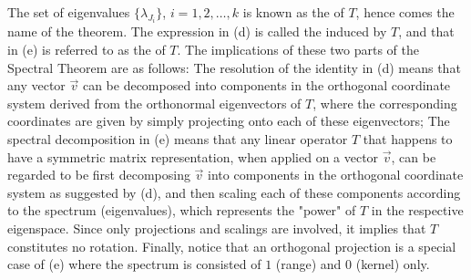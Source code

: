 The set of eigenvalues $\{\lambda_{J_i}\}$, $i = 1,2,\ldots,k$ is known as the  of $T$, hence comes the name of the theorem. The expression in (d) is called the  induced by $T$, and that in (e) is referred to as the  of $T$. The implications of these two parts of the Spectral Theorem are as follows: The resolution of the identity in (d) means that any vector $\vec{v}$ can be decomposed into components in the orthogonal coordinate system derived from the orthonormal eigenvectors of $T$, where the corresponding coordinates are given by simply projecting onto each of these eigenvectors; The spectral decomposition in (e) means that any linear operator $T$ that happens to have a symmetric matrix representation, when applied on a vector $\vec{v}$, can be regarded to be first decomposing $\vec{v}$ into components in the orthogonal coordinate system as suggested by (d), and then scaling each of these components according to the spectrum (eigenvalues), which represents the "power" of $T$ in the respective eigenspace. Since only projections and scalings are involved, it implies that $T$ constitutes no rotation. Finally, notice that an orthogonal projection is a special case of (e) where the spectrum is consisted of $1$ (range) and $0$ (kernel) only.\par
